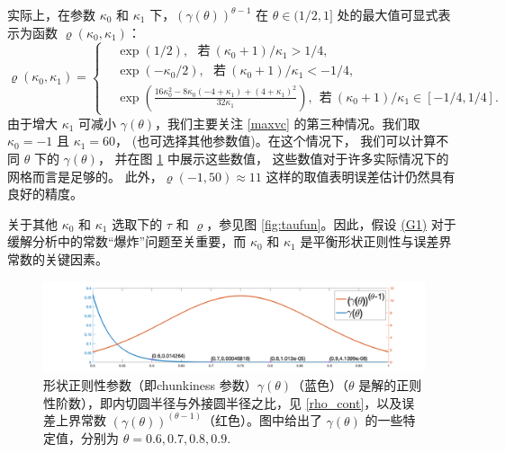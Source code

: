 \begin{remark}
\begin{itemize}
实际上，在参数 $\kappa_0$ 和 $\kappa_1$ 下，$(\gamma(\theta))^{\theta-1}$ 在 $\theta\in(1/2,1]$ 处的最大值可显式表示为函数 $\varrho(\kappa_0,\kappa_1)$：
\begin{equation}
\label{maxvc}
\varrho(\kappa_0,\kappa_1) 
= \begin{cases}
      & \exp(1/2), ~~~ \text{若}~ (\kappa_0+1)/\kappa_1 >1/4, \\
      & \exp(-\kappa_0/2), ~~~ \text{若}~ (\kappa_0+1)/\kappa_1 <-1/4, \\
      &\exp(\frac{16 \kappa_0^2 - 8 \kappa_0 (-4 + \kappa_1) + (4 + \kappa_1)^2}{32\kappa_1}) , ~~ \text{若}~ (\kappa_0+1)/\kappa_1 \in [-1/4,1/4].
\end{cases}
\end{equation}
由于增大 $\kappa_1$ 可减小 $\gamma(\theta)$，我们主要关注 \eqref{maxvc} 
的第三种情况。我们取 $\kappa_0 = -1$ 且 $\kappa_1 = 60$，
(也可选择其他参数值)。在这个情况下，
我们可以计算不同 $\theta$ 下的 $\gamma(\theta)$，
并在图 \ref{fig:tauplot} 中展示这些数值，
这些数值对于许多实际情况下的网格而言是足够的。
此外，$\varrho(-1,50)\approx 11$ 这样的取值表明误差估计仍然具有良好的精度。

关于其他 $\kappa_0$ 和 $\kappa_1$ 选取下的 $\tau$ 和 $\varrho$，参见图 \ref{fig:taufun}。因此，假设 \hyperref[asp:polygonG1]{(G1)} 对于缓解分析中的常数“爆炸”问题至关重要，而 $\kappa_0$ 和 $\kappa_1$ 是平衡形状正则性与误差界常数的关键因素。

\begin{figure}[h]
\centering
\includegraphics[width=5in]{./figures/maxwell/tauplot.pdf}
\caption{形状正则性参数（即chunkiness 参数）$\gamma(\theta)$（蓝色）（$\theta$
是解的正则性阶数），即内切圆半径与外接圆半径之比，见
\eqref{rho_cont}，以及误差上界常数
$(\gamma(\theta))^{(\theta-1)}$（红色）。图中给出了 $\gamma(\theta)$
的一些特定值，分别为 $\theta = 0.6, 0.7, 0.8, 0.9$.}
\label{fig:tauplot}
\end{figure}


\end{itemize}
\end{remark}
